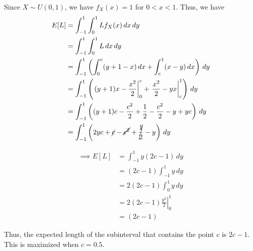 Since \( X \sim U(0, 1) \), we have \( f_X(x) = 1 \) for \( 0 < x < 1 \).
Thus, we have
\begin{align*}
    E[L]
     & =
    \int_{-1}^{1} \int_{0}^{1} L f_X(x) \, dx \, dy
    \\ & =
    \int_{-1}^{1} \int_{0}^{1} L \, dx \, dy
    \\ & =
    \int_{-1}^{1}
    \left(
    \int_{0}^{c} (y+1-x) \, dx
    +
    \int_{c}^{1} (x-y) \, dx
    \right)
    \, dy
    \\ & =
    \int_{-1}^{1}
    \left(
    \left. (y+1)x - \frac{x^2}{2} \right|_{0}^{c}
    +
    \left. \frac{x^2}{2} - yx \right|_{c}^{1}
    \right)
    \, dy
    \\ & =
    \int_{-1}^{1}
    \left(
    (y+1)c - \frac{c^2}{2}
    +
    \frac{1}{2} - \frac{c^2}{2} - y + yc
    \right)
    \, dy
    \\ & =
    \int_{-1}^{1}
    \left(
    2yc + \cancel{c} - \cancel{c^2} + \cancel{\frac{1}{2}} - y
    \right)
    \, dy
\end{align*}

\begin{align*}
    \implies
    E[L]
     & =
    \int_{-1}^{1}
    y(2c - 1)
    \, dy
    \\ & =
    (2c - 1)
    \int_{-1}^{1}
    y
    \, dy
    \\ & =
    2(2c - 1)
    \int_{0}^{1}
    y
    \, dy
    \\ & =
    2(2c - 1)
    \left.
    \frac{y^2}{2}
    \right|_{0}^{1}
    \\ & =
    (2c - 1)
\end{align*}

Thus, the expected length of the subinterval that contains the point \( c \) is \( 2c - 1 \).
This is maximized when \( c = 0.5 \).
